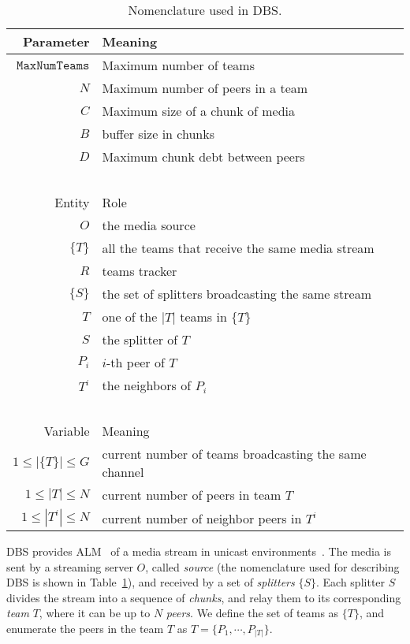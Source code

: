 \label{sec:DBS}

\begin{table}
  \begin{tabular}{rl}
    Parameter & Meaning \\
    \hline
    $\mathtt{MaxNumTeams}$ & Maximum number of teams \\
    $N$       & Maximum number of peers in a team \\
    $C$       & Maximum size of a chunk of media \\
    $B$       & buffer size in chunks \\
    $D$       & Maximum chunk debt between peers \\
    ~\\
    Entity  & Role \\
    \hline
    $O$     & the media source \\
    $\{T\}$ & all the teams that receive the same media stream \\
    $R$     & teams tracker \\
    $\{S\}$ & the set of splitters broadcasting the same stream \\
    $T$     & one of the $|T|$ teams in $\{T\}$ \\
    $S$     & the splitter of $T$ \\
    $P_i$   & $i$-th peer of $T$ \\
    $T^i$   & the neighbors of $P_i$ \\
    ~\\
    Variable            & Meaning \\
    \hline
    $1\leq |\{T\}|\leq G$ & current number of teams broadcasting the same channel \\
    $1\leq |T|\leq N$     & current number of peers in team $T$ \\
    $1\leq |T^i|\leq N$   & current number of neighbor peers in $T^i$ \\
  \end{tabular}
  \caption{Nomenclature used in DBS.\label{tab:DBS_nomenclature}}
\end{table}

DBS provides ALM~\cite{banerjee2002scalable} of a media stream in
unicast environments~\cite{comer2003computer}. The media is sent by a
streaming server $O$, called \emph{source} (the nomenclature used for
describing DBS is shown in Table~\ref{tab:DBS_nomenclature}), and
received by a set of \emph{splitters} $\{S\}$.
Each splitter $S$ divides the stream into a sequence of
\emph{chunks}, and relay them to its corresponding \emph{team} $T$,
where it can be up to $N$ \emph{peers}. We define the set of teams as
$\{T\}$,
and enumerate the peers in the team $T$ as $T=\{P_1,\cdots,P_{|T|}\}$.

